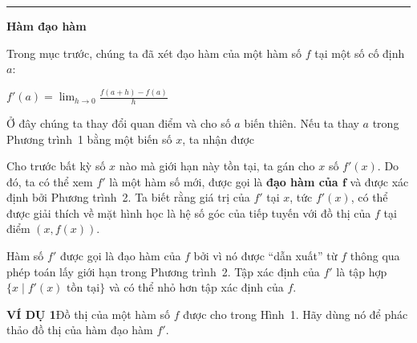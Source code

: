 \noindent
\hspace*{0.29\textwidth}%
\begin{minipage}[t]{0.71\textwidth}
  {\color{stewartcyan}\rule{1.1ex}{1.1ex}}\hspace{0.5em}\textbf{\textsf{\large Hàm đạo hàm}}
  \par\vspace{0.7em}

  Trong mục trước, chúng ta đã xét đạo hàm của một hàm số $f$ tại một số cố định $a$:
  \par\vspace{0.8em}

  \noindent
  \hfill
  $\displaystyle f'(a) = \lim_{h \to 0} \frac{f(a+h) - f(a)}{h}$
  \hfill\null
  \par\vspace{0.8em}

  Ở đây chúng ta thay đổi quan điểm và cho số $a$ biến thiên. Nếu ta thay $a$ trong Phương trình~1 bằng một biến số $x$, ta nhận được
  \par\vspace{0.8em}

  \noindent
  \hfill
  \setlength{\fboxrule}{0.8pt}\setlength{\fboxsep}{6.5pt}%
  \hfill\null
  \par\vspace{1.1em}

  Cho trước bất kỳ số $x$ nào mà giới hạn này tồn tại, ta gán cho $x$ số $f'(x)$. Do đó, ta có thể xem $f'$ là một hàm số mới, được gọi là \textbf{đạo hàm của $\boldsymbol{f}$} và được xác định bởi Phương trình~2. Ta biết rằng giá trị của $f'$ tại $x$, tức $f'(x)$, có thể được giải thích về mặt hình học là hệ số góc của tiếp tuyến với đồ thị của $f$ tại điểm $(x, f(x))$.
  \par\vspace{0.8em}

  Hàm số $f'$ được gọi là đạo hàm của $f$ bởi vì nó được “dẫn xuất” từ $f$ thông qua phép toán lấy giới hạn trong Phương trình~2. Tập xác định của $f'$ là tập hợp $\{x \mid f'(x)\text{ tồn tại}\}$ và có thể nhỏ hơn tập xác định của $f$.
  \par\vspace{1.3em}

  \textbf{\textsf{\color{stewartcyan}VÍ DỤ 1}}\hspace{1em}Đồ thị của một hàm số $f$ được cho trong Hình~1. Hãy dùng nó để phác thảo đồ thị của hàm đạo hàm $f'$.
\end{minipage}

